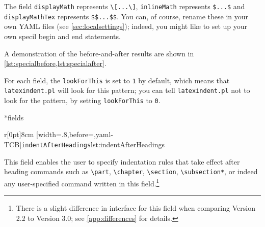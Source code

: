 	The field \texttt{displayMath} represents \lstinline!\[...\]!, \texttt{inlineMath} represents
	\lstinline!$...$! and \texttt{displayMathTex} represents \lstinline!$$...$$!. You can, of course,
	rename these in your own YAML files (see \vref{sec:localsettings}); indeed, you
	might like to set up your own specil begin and end statements.

	A demonstration of the before-and-after results are shown in \cref{lst:specialbefore,lst:specialafter}.

	\begin{minipage}{.45\textwidth}
	\end{minipage}%
	\hfill
	\begin{minipage}{.45\textwidth}
	\end{minipage}

	For each field, the \texttt{lookForThis} is set to \texttt{1} by default, which means that \texttt{latexindent.pl}
	will look for this pattern; you can tell \texttt{latexindent.pl} not to look for the pattern, by setting
	\texttt{lookForThis} to \texttt{0}.

*{fields}
	\begin{wrapfigure}[17]{r}[0pt]{8cm}
		[width=.8\linewidth,before=\centering,yaml-TCB]{\texttt{indentAfterHeadings}}{lst:indentAfterHeadings}
	\end{wrapfigure}
	This field enables the user to specify
	indentation rules that take effect after heading commands such as \lstinline!\part!, \lstinline!\chapter!,
	\lstinline!\section!, \lstinline!\subsection*!, or indeed any user-specified command written in this field.\footnote{There is a slight
		difference in interface for this field when comparing Version 2.2 to Version 3.0; see \vref{app:differences} for details.}

